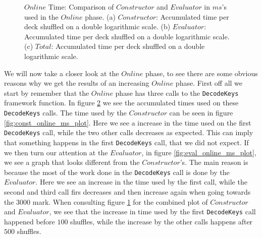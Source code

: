 \documentclass[twoside,11pt,openright]{report}
\begin{document}
\begin{figure}
    \begin{subfigure}{\textwidth}
        \centering
        \caption{}
        \label{fig:total_online_ms_plot}
    \end{subfigure}

    \caption{$Online$ Time: Comparison of $Constructor$ and $Evaluator$ in $ms$'s used in the $Online$ phase. (a) $Constructor$: Accumulated time per deck shuffled on a double logarithmic scale. (b) $Evaluator$: Accumulated time per deck shuffled on a double logarithmic scale. (c) $Total$: Accumulated time per deck shuffled on a double logarithmic scale.}
    \label{fig:mesurement_online_ms}
\end{figure}

We will now take a closer look at the $Online$ phase, to see there are some obvious reasons why we get the results of an increasing $Online$ phase. First off all we start by remember that the $Online$ phase has three calls to the \verb|DecodeKeys| framework function. In figure \ref{fig:mesurement_online_ms} we see the accumulated times used on these \verb|DecodeKeys| calls. The time used by the $Constructor$ can be seen in figure \ref{fig:const_online_ms_plot}. Here we see a increase in the time used on the first \verb|DecodeKeys| call, while the two other calls decreases as expected. This can imply that something happens in the first \verb|DecodeKeys| call, that we did not expect. If we then turn our attention at the $Evaluator$, in figure \ref{fig:eval_online_ms_plot}, we see a graph that looks different from the $Constructor$'s. The main reason is because the most of the work done in the \verb|DecodeKeys| call is done by the $Evaluator$. Here we see an increase in the time used by the first call, while the second and third call firs decreases and then increase again when going towards the $3000$ mark. When consulting figure \ref{fig:total_online_ms_plot} for the combined plot of $Constructor$ and $Evaluator$, we see that the increase in time used by the first \verb|DecodeKeys| call happened before $100$ shuffles, while the increase by the other calls happens after $500$ shuffles. 
\end{document}
